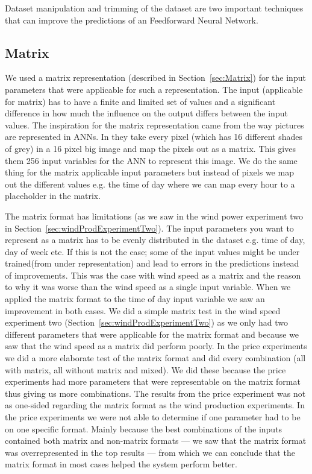 Dataset manipulation and trimming of the dataset are two important techniques that can improve the predictions of an Feedforward Neural Network.
\subsection{Matrix}
We used a matrix representation (described in Section~\ref{sec:Matrix}) for the input parameters that were applicable for such a representation. The input (applicable for matrix) has to have a finite and limited set of values and a significant difference in how much the influence on the output differs between the input values. The inspiration for the matrix representation came from the way pictures are represented in ANNs. In \cite{knerr1992handwritten} they take every pixel (which has 16 different shades of grey) in a 16 pixel big image and map the pixels out as a matrix. This gives them 256 input variables for the ANN to represent this image. We do the same thing for the matrix applicable input parameters but instead of pixels we map out the different values e.g. the time of day where we can map every hour to a placeholder in the matrix.

The matrix format has limitations (as we saw in the wind power experiment two in Section~\ref{sec:windProdExperimentTwo}). The input parameters you want to represent as a matrix has to be evenly distributed in the dataset e.g. time of day, day of week etc. If this is not the case; some of the input values might be under trained(from under representation) and lead to errors in the predictions instead of improvements. This was the case with wind speed as a matrix and the reason to why it was worse than the wind speed as a single input variable. When we applied the matrix format to the time of day input variable we saw an improvement in both cases. We did a simple matrix test in the wind speed experiment two (Section~\ref{sec:windProdExperimentTwo}) as we only had two different parameters that were applicable for the matrix format and because we saw that the wind speed as a matrix did perform poorly. In the price experiments we did a more elaborate test of the matrix format and did every combination (all with matrix, all without matrix and mixed). We did these because the price experiments had more parameters that were representable on the matrix format thus giving us more combinations. The results from the price experiment was not as one-sided regarding the matrix format as the wind production experiments. In the price experiments we were not able to determine if one parameter had to be on one specific format. Mainly because the best combinations of the inputs contained both matrix and non-matrix formats --- we saw that the matrix format was overrepresented in the top results --- from which we can conclude that the matrix format in most cases helped the system perform better.

